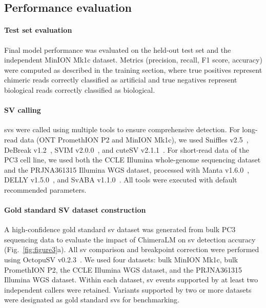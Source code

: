 \documentclass[pdflatex,sn-nature,lineno]{sn-jnl}%
\theoremstyle{thmstyleone}%
\theoremstyle{thmstyletwo}%
\theoremstyle{thmstylethree}%
\begin{document}
\subsection*{Performance evaluation}

\paragraph{Test set evaluation}
Final model performance was evaluated on the held-out test set and the independent MinION Mk1c dataset. Metrics (precision, recall, F1 score, accuracy) were computed as described in the training section, where true positives represent chimeric reads correctly classified as artificial and true negatives represent biological reads correctly classified as biological.

\paragraph{SV calling}
\glspl{sv} were called using multiple tools to ensure comprehensive detection. For long-read data (ONT PromethION P2 and MinION Mk1c), we used Sniffles v2.5~\cite{Sedlazeck2018, Smolka2024}, DeBreak v1.2~\cite{chen2023deciphering}, SVIM v2.0.0~\cite{heller2019svim}, and cuteSV v2.1.1~\cite{jiang2020longreadbased}. For short-read data of the PC3 cell line, we used both the CCLE Illumina whole-genome sequencing dataset and the PRJNA361315 Illumina WGS dataset, processed with Manta v1.6.0~\cite{chen2016manta}, DELLY v1.5.0~\cite{rausch2012delly}, and SvABA v1.1.0~\cite{wala2018svaba}. All tools were executed with default recommended parameters.

\paragraph{Gold standard SV dataset construction}
A high-confidence gold standard \gls{sv} dataset was generated from bulk PC3 sequencing data to evaluate the impact of ChimeraLM on \gls{sv} detection accuracy (Fig.~\ref{fig:figure3}a).
All \gls{sv} comparison and breakpoint correction were performed using OctopuSV v0.2.3~\cite{guo2025octopusv}.
We used four datasets: bulk MinION Mk1c, bulk PromethION P2, the CCLE Illumina WGS dataset, and the PRJNA361315 Illumina WGS dataset.
Within each dataset, \gls{sv} events supported by at least two independent callers were retained.
Variants supported by two or more datasets were designated as gold standard \glspl{sv} for benchmarking.
\end{document}
